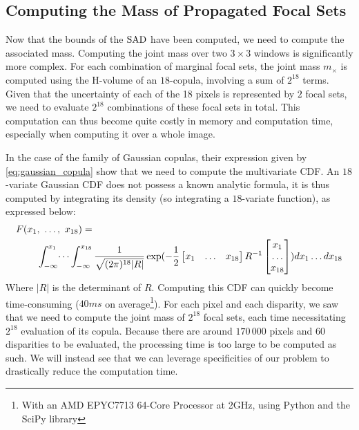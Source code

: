 \subsection{Computing the Mass of Propagated Focal Sets}\label{sec:propagated_masses}
Now that the bounds of the $\mathrm{SAD}$ have been computed, we need to compute the associated mass. Computing the joint mass over two $3 \times 3$ windows is significantly more complex. For each combination of marginal focal sets, the joint mass $m_{\times}$ is computed using the H-volume of an $18$-copula, involving a sum of $2^{18}$ terms. Given that the uncertainty of each of the 18 pixels is represented by $2$ focal sets, we need to evaluate $2^{18}$ combinations of these focal sets in total. This computation can thus become quite costly in memory and computation time, especially when computing it over a whole image.

In the case of the family of Gaussian copulas, their expression given by \cref{eq:gaussian_copula} show that we need to compute the multivariate CDF. An $18$-variate Gaussian CDF does not possess a known analytic formula, it is thus computed by integrating its density (so integrating a $18$-variate function), as expressed below:
\begin{align}\label{eq:gaussian_cdf}
    F(x_1 &, ~\dots, ~ x_{18}) =\nonumber\\ &\int_{-\infty}^{x_1}\dots\int_{-\infty}^{x_{18}}\frac{1}{\sqrt{(2\pi)^{18}|R|}}\exp(-\frac{1}{2}\begin{bmatrix}x_1 & \dots & x_{18}\end{bmatrix}R^{-1}\begin{bmatrix}x_1 \\ \dots \\ x_{18}\end{bmatrix})dx_1\dots dx_{18}
\end{align}
Where $|R|$ is the determinant of $R$. Computing this CDF can quickly become time-consuming ($40ms$ on average\footnote{With an AMD EPYC7713  64-Core Processor at 2GHz, using Python and the SciPy library}). For each pixel and each disparity, we saw that we need to compute the joint mass of $2^{18}$ focal sets, each time necessitating $2^{18}$ evaluation of its copula. Because there are around $170\,000$ pixels and $60$ disparities to be evaluated, the processing time is too large to be computed as such. We will instead see that we can leverage specificities of our problem to drastically reduce the computation time.
 

